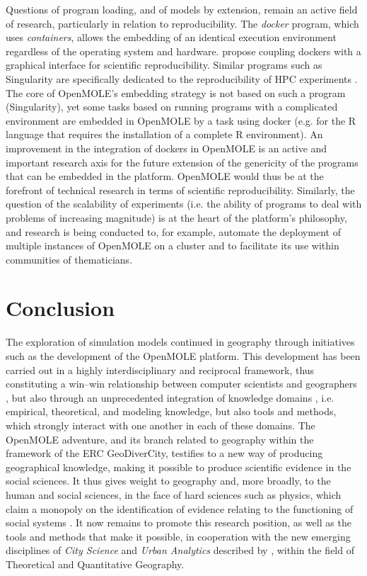 \documentclass[10pt]{article}
\begin{document}
Questions of program loading, and of models by extension, remain an active field of research, particularly in relation to reproducibility. The \emph{docker} program, which uses \emph{containers}, allows the embedding of an identical execution environment regardless of the operating system and hardware. \cite{hung2016guidock} propose coupling dockers with a graphical interface for scientific reproducibility. Similar programs such as Singularity are specifically dedicated to the reproducibility of HPC experiments \citep{kurtzer2017singularity}. The core of OpenMOLE’s embedding strategy is not based on such a program (Singularity), yet some tasks based on running programs with a complicated environment are embedded in OpenMOLE by a task using docker (e.g. for the R language that requires the installation of a complete R environment). An improvement in the integration of dockers in OpenMOLE is an active and important research axis for the future extension of the genericity of the programs that can be embedded in the platform. OpenMOLE would thus be at the forefront of technical research in terms of scientific reproducibility. Similarly, the question of the scalability of experiments (i.e. the ability of programs to deal with problems of increasing magnitude) is at the heart of the platform’s philosophy, and research is being conducted to, for example, automate the deployment of multiple instances of OpenMOLE on a cluster and to facilitate its use within communities of thematicians.



\section{Conclusion}

The exploration of simulation models continued in geography through initiatives such as the development of the OpenMOLE platform. This development has been carried out in a highly interdisciplinary and reciprocal framework, thus constituting a win–win relationship between computer scientists and geographers \cite{pumaincomplexity}, but also through an unprecedented integration of knowledge domains  \citep{raimbault2017applied}, i.e. empirical, theoretical, and modeling knowledge, but also tools and methods, which strongly interact with one another in each of these domains. The OpenMOLE adventure, and its branch related to geography within the framework of the ERC GeoDiverCity, testifies to a new way of producing geographical knowledge, making it possible to produce scientific evidence in the social sciences. It thus gives weight to geography and, more broadly, to the human and social sciences, in the face of hard sciences such as physics, which claim a monopoly on the identification of evidence relating to the functioning of social systems \citep{dupuy2015sciences}. It now remains to promote this research position, as well as the tools and methods that make it possible, in cooperation with the new emerging disciplines of \emph{City Science} and \emph{Urban Analytics} described by \cite{batty2019urban}, within the field of Theoretical and Quantitative Geography.
\end{document}
